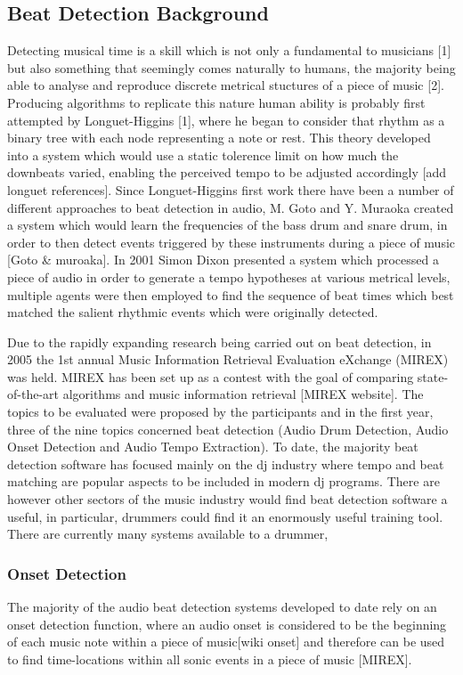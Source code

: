 \documentclass[a4paper, 11pt]{article}
\begin{document}
\subsection{Beat Detection Background}

Detecting musical time is a skill which is not only a fundamental to musicians [1] but also something that seemingly comes naturally to humans, the majority being able to analyse and reproduce discrete metrical stuctures of a piece of music [2]. Producing algorithms to replicate this nature human ability is probably first attempted by Longuet-Higgins [1], where he began to consider that rhythm as a binary tree with each node representing a note or rest. This theory developed into a system which would use a static tolerence limit on how much the downbeats varied, enabling the perceived tempo to be adjusted accordingly [add longuet references]. Since Longuet-Higgins first work there have been a number of different approaches to beat detection in audio, M. Goto and Y. Muraoka created a system which would learn the frequencies of the bass drum and snare drum, in order to then detect events triggered by these instruments during a piece of music [Goto \& muroaka]. In 2001 Simon Dixon presented a system which processed a piece of audio in order to generate a tempo hypotheses at various metrical levels, multiple agents were then employed to find the sequence of beat times which best matched the salient rhythmic events which were originally detected.

Due to the rapidly expanding research being carried out on beat detection, in 2005 the 1st annual Music Information Retrieval Evaluation eXchange (MIREX) was held. MIREX has been set up as a contest with the goal of comparing state-of-the-art algorithms and music information retrieval [MIREX website]. The topics to be evaluated were proposed by the participants and in the first year, three of the nine topics concerned beat detection (Audio Drum Detection, Audio Onset Detection and Audio Tempo Extraction). To date, the majority beat detection software has focused mainly on the dj industry where tempo and beat matching are popular aspects to be included in modern dj programs. There are however other sectors of the music industry would find beat detection software a useful, in particular, drummers could find it an enormously useful training tool. There are currently many systems available to a drummer, 






\subsubsection{Onset Detection}
The majority of the audio beat detection systems developed to date rely on an onset detection function, where an audio onset is considered to be the beginning of each music note within a piece of music[wiki onset] and therefore can be used to find time-locations within all sonic events in a piece of music [MIREX]. 
\end{document}
